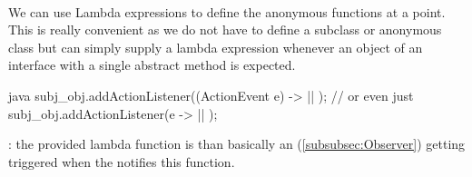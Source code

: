 \begin{defnbox}\nospacing
  \begin{defn}\label{defn:FunctionalInterfacesAndLambda}\leavevmode\\
    We can use Lambda expressions to define the anonymous functions at a point.\\
    This is really convenient as we do not have to define a subclass or
    anonymous class but can simply supply a lambda expression whenever an object
    of an interface with a single abstract method is expected.
    \begin{mintlinebox}{java}
    subj_obj.addActionListener((ActionEvent e) -> {
      |\optldots|
      });
      // or even just
    subj_obj.addActionListener(e -> {
      |\optldots|
      });
    \end{mintlinebox}
    : the provided lambda function is than basically an
     (\cref{subsubsec:Observer}) getting triggered when the 
    notifies this function.
  \end{defn}
\end{defnbox}

